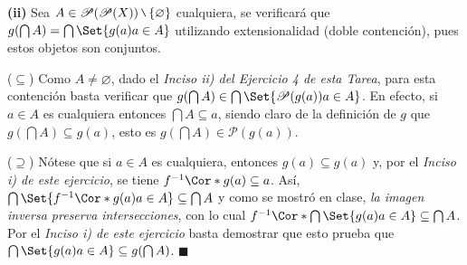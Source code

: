 \documentclass[12pt]{article}
\providecommand\given{}
\renewcommand{\emptyset}{\varnothing}
\newcounter{A}
\newcommand{\mysetminusD}{\hbox{\tikz{\draw[line width=0.6pt,line cap=round] (3pt,0) -- (0,6pt);}}}
\newcommand{\mysetminusT}{\mysetminusD}
\newcommand{\mysetminusS}{\hbox{\tikz{\draw[line width=0.45pt,line cap=round] (2pt,0) -- (0,4pt);}}}
\newcommand{\mysetminusSS}{\hbox{\tikz{\draw[line width=0.4pt,line cap=round] (1.5pt,0) -- (0,3pt);}}}
\newcommand{\mysetminus}{\mathbin{\mathchoice{\mysetminusD}{\mysetminusT}{\mysetminusS}{\mysetminusSS}}}
\renewcommand{\setminus}{\mysetminus}
\newcommand{\QED}{\hfill\ensuremath{\blacksquare}}
\begin{document}
    \textbf{(ii)} Sea $A \in \mathscr{P}(\mathscr{P}(X)) \setminus \{\emptyset\}$ cualquiera, se verificará que $g(\bigcap A)=\bigcap \Set{g(a) \given a \in A}$ utilizando extensionalidad (doble contención), pues estos objetos son conjuntos.

    (\(\subseteq\)) Como \(A \neq \emptyset\), dado el \textit{Inciso ii) del Ejercicio 4 de esta Tarea}, para esta contención basta verificar que \(g(\bigcap A) \in \bigcap\Set{\mathscr{P}(g(a)) \given a \in A} \). En efecto, si \(a \in A\) es cualquiera entonces \(\bigcap A \subseteq a\), siendo claro de la definición de \(g\) que \(g(\bigcap A) \subseteq g(a)\), esto es \(g(\bigcap A) \in \mathscr{P}(g(a))\).

    (\(\supseteq\)) Nótese que si \(a \in A\) es cualquiera, entonces \(g(a) \subseteq g(a)\) y, por el \textit{Inciso i) de este ejercicio}, se tiene \(f^{-1}\Cor*{g(a)} \subseteq a\). Así, \(\bigcap \Set{ f^{-1}\Cor*{ g(a) } \given a \in A} \subseteq \bigcap A \) y como se mostró en clase, \textit{la imagen inversa preserva intersecciones}, con lo cual \(f^{-1}\Cor*{\bigcap \Set{g(a) \given a \in A}} \subseteq \bigcap A \). Por el \textit{Inciso i) de este ejercicio} basta demostrar que esto prueba que \(\bigcap \Set{g(a) \given a \in A} \subseteq g(\bigcap A)\). \QED 
\end{document}
